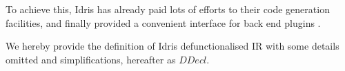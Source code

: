 \documentclass[a1,portrait]{a1poster}
\begin{document}
\begin{multicols}{2}
To achieve this, Idris has already paid lots of efforts to their code generation facilities,
and finally provided a convenient interface for back end plugins \cite{brady2015cross}.

We hereby provide the definition of Idris defunctionalised IR with some details omitted and simplifications,
hereafter as $DDecl$.

\vspace{-1cm}

\begin{multicols}{2}
\vspace{-1.0cm}
\begin{minipage}[b]{0.8\linewidth}
\begin{bnf*}
    \\
    \\
    \\
    \\
    \\
    \\
    \\
    \\
    \\
    \\
    \\
    \\
\end{bnf*}
\end{minipage}


\end{multicols}
\end{multicols}
\end{document}
